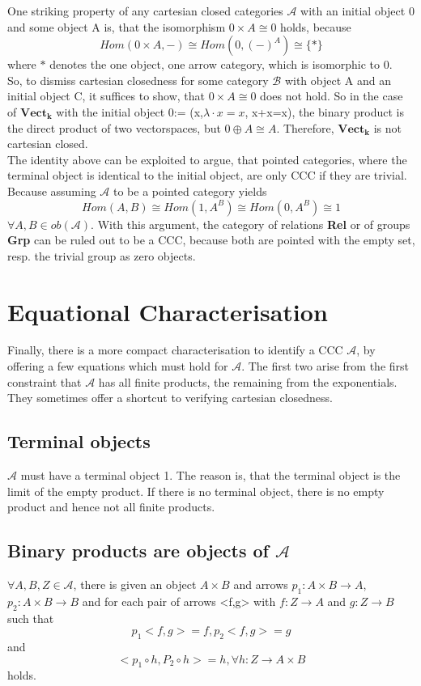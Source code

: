 One striking property of any cartesian closed categories $\mathcal{A}$ with an initial object 0 and some object A is, that the isomorphism $0 \times A \cong 0$ holds,
because $$Hom(0 \times A, -) \cong Hom(0, (-)^A) \cong \{ \ast \}$$
where {$\ast$} denotes the one object, one arrow category, which is isomorphic to 0.
 \\
 So, to dismiss cartesian closedness for some category $\mathcal{B}$ with object A and an initial object C, it suffices to show, that $0 \times A \cong 0$ does not hold.
So in the case of $\boldsymbol{Vect_k}$ with the initial object 0:= ({x},$\lambda \cdot x=x$, x+x=x), the binary product is the direct product of two vectorspaces, but $0 \oplus A \cong A$. Therefore, $\boldsymbol{Vect_k}$ is not cartesian closed.
 \\
The identity above can be exploited to argue, that pointed categories, where the terminal object is identical to the initial object, are only CCC if they are trivial.
Because assuming $\mathcal{A}$ to be a pointed category yields $$Hom(A,B) \cong Hom(1,A^B) \cong Hom(0,A^B) \cong 1$$  $\forall A,B \in ob(\mathcal{A})$.
With this argument, the category of relations \textbf{Rel} or of groups \textbf{Grp} can be ruled out to be a CCC, because both are pointed with the empty set, resp. the trivial group as zero objects. 
 


\section{Equational Characterisation}
Finally, there is a more compact characterisation to identify a CCC $\mathcal{A}$, by offering a few equations which must hold for $\mathcal{A}$.
The first two arise from the first constraint that $\mathcal{A}$ has all finite products, the remaining from the exponentials.
They sometimes offer a shortcut to verifying cartesian closedness.
\subsection{Terminal objects}
$\mathcal{A}$ must have a terminal object 1. The reason is, that the terminal object is the limit of the empty product.
If there is no terminal object, there is no empty product and hence not all finite products.
\subsection{Binary products are objects of $\mathcal{A}$}
$\forall A,B,Z\in \mathcal{A}$, there is given an object $A \times B$ and arrows $p_1:A \times B \to A$, $p_2:A \times B \to B$ and for each pair of arrows <f,g> with $f:Z \to A$ and $g:Z \to B$ such that
$$ p_1<f,g> = f, p_2<f,g>=g$$ and $$<p_1 \circ  h,P_2 \circ h> = h, \forall h : Z \to A \times B $$ holds.
